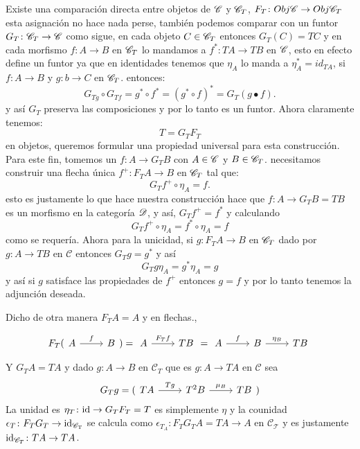 \documentclass{comunicaciones}
\begin{document}
Existe una comparación directa entre objetos de $\EuScript{C}$ y $\EuScript{C}_{T}$, $F_{T}\colon Obj\EuScript{C}\rightarrow Obj\EuScript{C}_{T}$ esta asignación no hace nada perse, también podemos comparar con un funtor
$G_{T}\colon\EuScript{C}_{T}\rightarrow\EuScript{C}$ como sigue, en cada objeto $C\in\EuScript{C}_{T}$ entonces $G_{T}(C)=TC $ y en cada morfismo $f\colon A\rightarrow B$ en $\EuScript{C}_{T}$
lo mandamos a $f^{*}\colon TA\rightarrow TB$ en $\EuScript{C}$, esto en efecto define un funtor ya que en identidades tenemos que $\eta_{A}$ lo manda a $\eta_{A}^{*}=id_{TA}$, si $f\colon A\rightarrow B$ y $g\colon b\rightarrow C$ en $\EuScript{C}_{T}$.
entonces: \[G_{Tg}\circ G_{Tf}=g^{*}\circ f^{*}=(g^{*}\circ f)^{*}=G_{T}(g\bullet f).\] y así $G_{T}$ preserva las composiciones y por lo tanto es un funtor.
Ahora claramente tenemos: \[T=G_{T}F_{T}\] en objetos, queremos formular una propiedad universal para esta construcción.
Para este fin, tomemos un $f\colon A\rightarrow G_{T}B$ con $A\in\EuScript{C}$ y $B\in\EuScript{C}_{T}$. necesitamos construir una flecha única $f^{+}\colon F_{T}A\rightarrow B$ en $\EuScript{C}_{T}$ tal que:
\[G_{T}f^{+}\circ\eta_{A}=f.\] esto es justamente lo que hace nuestra construcción hace que $f\colon A\rightarrow G_{T}B=TB$ es un morfismo en la categoría $\EuScript{D}$, y así,
$G_{T}f^{+}=f^{*}$ y calculando \[G_{T}f^{+}\circ\eta_{A}=f^{*}\circ\eta_{A}=f\] como se requería. Ahora para la unicidad, si $g\colon F_{T}A\rightarrow B$ en $\EuScript{C}_{T}$  dado por $g\colon A\rightarrow TB$
en $\mathcal{C}$ entonces $G_{T}g=g^{*}$ y así \[G_{T}g\eta_{A}=g^{*}\eta_{A}=g\] y así si $g$ satisface las propiedades de $f^{+}$ entonces $g=f$ y por lo tanto tenemos la adjunción deseada.


Dicho de otra manera $F_{T}A=A$ y en flechas.,

\[F_{T}(\begin{tikzcd} A\ar[r,"f"] & B
    \end{tikzcd})=\begin{tikzcd} A\ar[r,"F_{T}f"] & TB
    \end{tikzcd}=\begin{tikzcd} A\ar[r,"f"] & B \ar[r,"\eta_{B}"] &TB
    \end{tikzcd}\]

Y $G_{T}A=TA$ y dado $g\colon A\rightarrow B$ en $\mathcal{C}_{T}$ que es $g\colon A\rightarrow TA$ en $\mathcal{C}$
sea \[G_{T}g=(\begin{tikzcd} TA\ar[r,"Tg"] & 
    T^{2}B\ar[r,"\mu_{B}"] & TB
\end{tikzcd})\]
La unidad es $\eta_{T}\colon {\rm id}\rightarrow G_{T}F_{T}=T$ es simplemente $\eta$ y la counidad $\epsilon_{T}\colon F_{T}G_{T}\rightarrow {\rm id_{\mathcal{C}_{T}}}$
se calcula como $\epsilon_{{T}_{A}}\colon F_{T}G_{T}A=TA\rightarrow A$ en $\mathcal{C_{T}}$ y es justamente ${\rm id}_{\mathcal{C}_{T}}\colon TA\rightarrow TA$.
\end{document}
